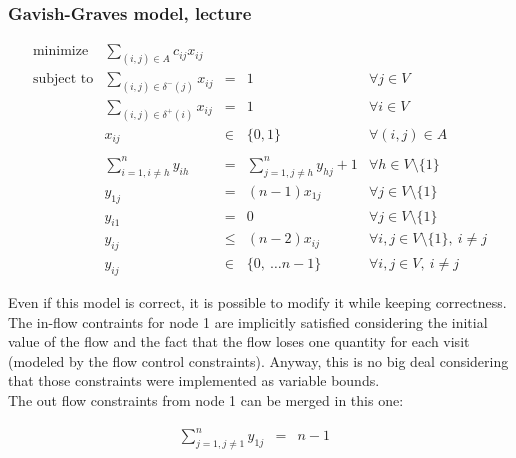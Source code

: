 \subsubsection{Gavish-Graves model, lecture}
\begin{equation*}
    \begin{array}{lrllr}
        \textrm{minimize}   & \displaystyle\sum_{(i, j) \in A} c_{ij}  x_{ij} \\
        \textrm{subject to} & \displaystyle\sum\limits_{(i, j) \in \delta^-(j)}  x_{ij} & = & 1 & \forall j \in V\\
                            & \displaystyle\sum\limits_{(i, j) \in \delta^+(i)}  x_{ij} & = & 1 & \forall i \in V\\
                            & x_{ij} & \in & \{0,1\} & \forall (i,j) \in A \\ \\
                            & \displaystyle\sum\limits_{i = 1, i \neq h}^n y_{ih} & = & \displaystyle\sum\limits_{j = 1, j \neq h}^n y_{hj} + 1 & \forall h \in V \setminus \{1\}\\
                            & y_{1j} & = & (n - 1) x_{1j} & \forall j \in V \setminus \{1\} \\
                            & y_{i1} & = & 0 & \forall j \in V \setminus \{1\} \\
                            & y_{ij} & \leq & (n - 2) x_{ij} & \forall i, j \in V \setminus \{1\},\ i \neq j \\
                            & y_{ij} & \in & \{0,\ \dots n-1\} & \forall i,j \in V,\ i \neq j
    \end{array}
\end{equation*}

Even if this model is correct, it is possible to modify it while keeping
correctness. The in-flow contraints for node 1 are implicitly satisfied
considering the initial value of the flow and the fact that the flow loses one
quantity for each visit (modeled by the flow control constraints). Anyway, this
is no big deal considering that those constraints were implemented as variable
bounds.\\ The out flow constraints from node 1 can be merged in this one:

\begin{equation*} 
    \begin{array}{rrlr} 
        \displaystyle\sum\limits_{j = 1, j \neq 1}^n y_{1j} & = & n - 1 & \\
    \end{array} 
\end{equation*}

